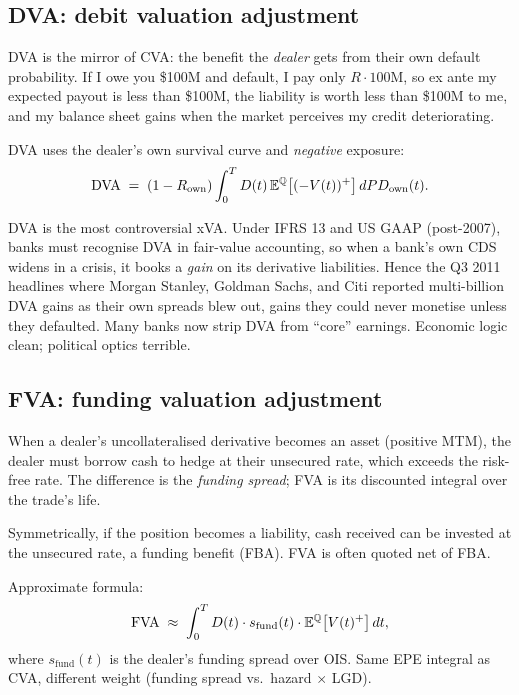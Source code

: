 \subsection{DVA: debit valuation adjustment}

DVA is the mirror of CVA: the benefit the \emph{dealer} gets from
their own default probability.  If I owe you \$100M and default, I
pay only $R \cdot 100$M, so ex ante my expected payout is less
than \$100M, the liability is worth less than \$100M to me, and my
balance sheet gains when the market perceives my credit
deteriorating.

DVA uses the dealer's own survival curve and \emph{negative}
exposure:
\[
  \mathrm{DVA}
  \;=\; (1-R_{\mathrm{own}}) \int_0^T D(t)\,
       \mathbb{E}^{\mathbb{Q}} \big[(-V(t))^+\big]\,
       dPD_{\mathrm{own}}(t).
\]

\begin{pitfallbox}
DVA is the most controversial xVA.  Under IFRS 13 and US GAAP
(post-2007), banks must recognise DVA in fair-value accounting,
so when a bank's own CDS widens in a crisis, it books a \emph{gain}
on its derivative liabilities.  Hence the Q3 2011 headlines where
Morgan Stanley, Goldman Sachs, and Citi reported multi-billion DVA
gains as their own spreads blew out, gains they could never
monetise unless they defaulted.  Many banks now strip DVA from
``core'' earnings.  Economic logic clean; political optics
terrible.
\end{pitfallbox}

\subsection{FVA: funding valuation adjustment}

When a dealer's uncollateralised derivative becomes an asset
(positive MTM), the dealer must borrow cash to hedge at their
unsecured rate, which exceeds the risk-free rate.  The difference
is the \emph{funding spread}; FVA is its discounted integral over
the trade's life.

Symmetrically, if the position becomes a liability, cash received
can be invested at the unsecured rate, a funding benefit (FBA).
FVA is often quoted net of FBA.

Approximate formula:
\[
  \mathrm{FVA}
  \;\approx\; \int_0^T D(t) \cdot s_{\mathrm{fund}}(t)
              \cdot \mathbb{E}^{\mathbb{Q}}\big[V(t)^+\big]\, dt,
\]
where $s_{\mathrm{fund}}(t)$ is the dealer's funding spread over
OIS.  Same EPE integral as CVA, different weight (funding spread
vs.\ hazard $\times$ LGD).

